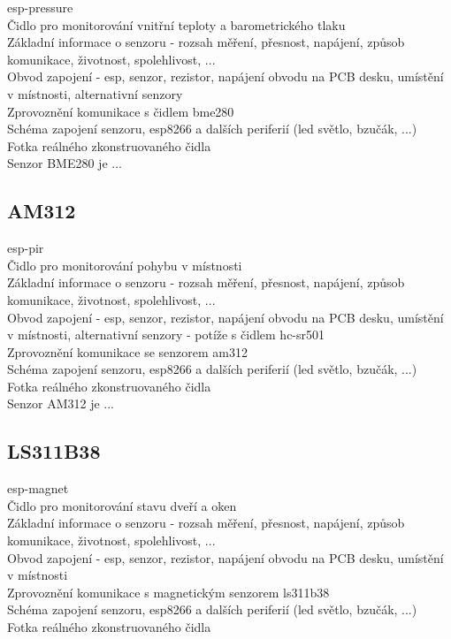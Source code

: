 esp-pressure \\
Čidlo pro monitorování vnitřní teploty a barometrického tlaku \\
Základní informace o senzoru - rozsah měření, přesnost, napájení, způsob komunikace, životnost, spolehlivost, ... \\
Obvod zapojení - esp, senzor, rezistor, napájení obvodu na PCB desku, umístění v místnosti, alternativní senzory \\
Zprovoznění komunikace s čidlem bme280 \\
Schéma zapojení senzoru, esp8266 a dalších periferií (led světlo, bzučák, ...) \\
Fotka reálného zkonstruovaného čidla \\

Senzor BME280 je ...

\subsection{AM312}

esp-pir \\
Čidlo pro monitorování pohybu v místnosti \\
Základní informace o senzoru - rozsah měření, přesnost, napájení, způsob komunikace, životnost, spolehlivost, ... \\
Obvod zapojení - esp, senzor, rezistor, napájení obvodu na PCB desku, umístění v místnosti, alternativní senzory - potíže s čidlem hc-sr501\\
Zprovoznění komunikace se senzorem am312 \\
Schéma zapojení senzoru, esp8266 a dalších periferií (led světlo, bzučák, ...) \\
Fotka reálného zkonstruovaného čidla \\

Senzor AM312 je ...

\subsection{LS311B38}

esp-magnet \\
Čidlo pro monitorování stavu dveří a oken \\
Základní informace o senzoru - rozsah měření, přesnost, napájení, způsob komunikace, životnost, spolehlivost, ... \\
Obvod zapojení - esp, senzor, rezistor, napájení obvodu na PCB desku, umístění v místnosti \\
Zprovoznění komunikace s magnetickým senzorem ls311b38 \\
Schéma zapojení senzoru, esp8266 a dalších periferií (led světlo, bzučák, ...) \\
Fotka reálného zkonstruovaného čidla \\

